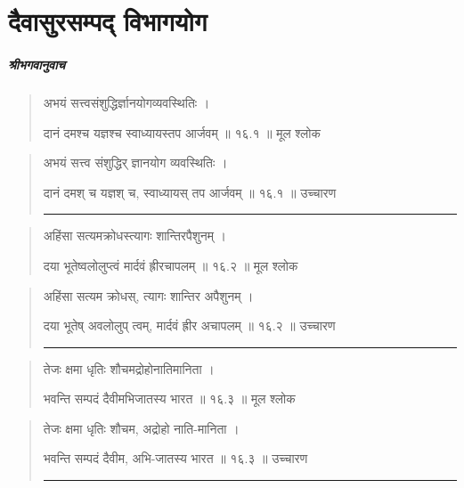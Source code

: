 \chapter{\sanskrit दैवासुरसम्पद् विभागयोग} 
\paragraph{\sanskrit श्रीभगवानुवाच}
\begin{quotation} 
अभयं सत्त्वसंशुद्धिर्ज्ञानयोगव्यवस्थितिः ।  

दानं दमश्च यज्ञश्च स्वाध्यायस्तप आर्जवम्‌  ॥ १६.१ ॥  मूल श्लोक
\end{quotation}

\begin{quotation}

अभयं सत्त्व संशुद्धिर् ज्ञानयोग व्यवस्थितिः ।  

दानं दमश् च यज्ञश् च, स्वाध्यायस् तप आर्जवम्‌  ॥ १६.१ ॥  उच्चारण

\noindent\rule{16cm}{0.4pt} 
\end{quotation}


\begin{quotation}

अहिंसा सत्यमक्रोधस्त्यागः शान्तिरपैशुनम्‌ ।  

दया भूतेष्वलोलुप्त्वं मार्दवं ह्रीरचापलम्‌  ॥ १६.२ ॥  मूल श्लोक
\end{quotation}

\begin{quotation}

अहिंसा सत्यम क्रोधस्, त्यागः शान्तिर अपैशुनम्‌ ।  

दया भूतेष् अवलोलुप् त्वम्,  मार्दवं ह्रीर अचापलम्‌  ॥ १६.२ ॥  उच्चारण

\noindent\rule{16cm}{0.4pt} 
\end{quotation}


\begin{quotation}

तेजः क्षमा धृतिः शौचमद्रोहोनातिमानिता ।  

भवन्ति सम्पदं दैवीमभिजातस्य भारत  ॥ १६.३ ॥  मूल श्लोक
\end{quotation}

\begin{quotation}

तेजः क्षमा धृतिः शौचम, अद्रोहो नाति-मानिता ।  

भवन्ति सम्पदं दैवीम, अभि-जातस्य भारत  ॥ १६.३ ॥  उच्चारण

\noindent\rule{16cm}{0.4pt} 
\end{quotation}


